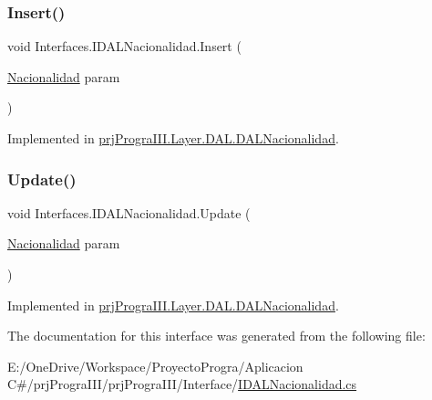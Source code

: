\subsubsection{\texorpdfstring{Insert()}{Insert()}}
{\footnotesize\ttfamily void Interfaces.\+I\+D\+A\+L\+Nacionalidad.\+Insert (\begin{DoxyParamCaption}\item[{\hyperlink{classprj_progra_i_i_i_1_1_layer_1_1_entities_1_1_nacionalidad}{Nacionalidad}}]{param }\end{DoxyParamCaption})}



Implemented in \hyperlink{classprj_progra_i_i_i_1_1_layer_1_1_d_a_l_1_1_d_a_l_nacionalidad_a9db21efb8376e322b250d5b2a6aaacbd}{prj\+Progra\+I\+I\+I.\+Layer.\+D\+A\+L.\+D\+A\+L\+Nacionalidad}.

\hypertarget{interface_interfaces_1_1_i_d_a_l_nacionalidad_ac0258a3e5e7bd4ea6a212ad5acf513da}{}\label{interface_interfaces_1_1_i_d_a_l_nacionalidad_ac0258a3e5e7bd4ea6a212ad5acf513da} 
\subsubsection{\texorpdfstring{Update()}{Update()}}
{\footnotesize\ttfamily void Interfaces.\+I\+D\+A\+L\+Nacionalidad.\+Update (\begin{DoxyParamCaption}\item[{\hyperlink{classprj_progra_i_i_i_1_1_layer_1_1_entities_1_1_nacionalidad}{Nacionalidad}}]{param }\end{DoxyParamCaption})}



Implemented in \hyperlink{classprj_progra_i_i_i_1_1_layer_1_1_d_a_l_1_1_d_a_l_nacionalidad_a3aef21dd2b5393e3d17501bdc60d589b}{prj\+Progra\+I\+I\+I.\+Layer.\+D\+A\+L.\+D\+A\+L\+Nacionalidad}.



The documentation for this interface was generated from the following file\+:\begin{DoxyCompactItemize}
\item 
E\+:/\+One\+Drive/\+Workspace/\+Proyecto\+Progra/\+Aplicacion C\#/prj\+Progra\+I\+I\+I/prj\+Progra\+I\+I\+I/\+Interface/\hyperlink{_i_d_a_l_nacionalidad_8cs}{I\+D\+A\+L\+Nacionalidad.\+cs}\end{DoxyCompactItemize}
